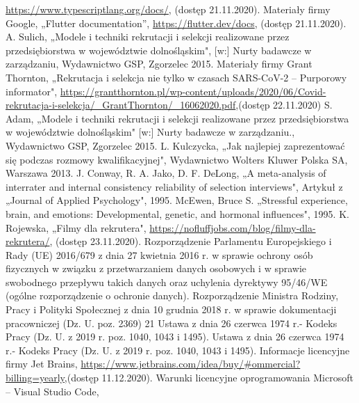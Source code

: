 \documentclass[twoside]{projektInzynierskiMS}
\numberwithin{figure}{section}
\begin{document}
\begin{thebibliography}{12}
\url{https://www.typescriptlang.org/docs/}, (dostęp 21.11.2020).
 Materiały firmy Google, „Flutter documentation”, \newline
\url{https://flutter.dev/docs}, (dostęp 21.11.2020).
 A. Sulich, „Modele i techniki rekrutacji i selekcji realizowane przez przedsiębiorstwa w województwie dolnośląskim", [w:] Nurty badawcze w zarządzaniu, Wydawnictwo GSP, Zgorzelec 2015.
 Materiały firmy Grant Thornton, „Rekrutacja i selekcja nie tylko w czasach SARS-CoV-2 -- Purporowy informator", \newline \url{https://grantthornton.pl/wp-content/uploads/2020/06/Covid-rekrutacja-i-selekcja/\_GrantThornton/\_16062020.pdf},\newline (dostęp 22.11.2020)
 S. Adam, „Modele i techniki rekrutacji i selekcji realizowane przez przedsiębiorstwa w województwie dolnośląskim" [w:] Nurty badawcze w zarządzaniu., Wydawnictwo GSP, Zgorzelec 2015.
 L. Kulczycka, „Jak najlepiej zaprezentować się podczas rozmowy kwalifikacyjnej", Wydawnictwo Wolters Kluwer Polska SA, Warszawa 2013.
 J. Conway, R. A. Jako, D. F. DeLong, „A meta-analysis of interrater and internal consistency reliability of selection interviews", Artykuł z „Journal of Applied Psychology", 1995.
 McEwen, Bruce S. „Stressful experience, brain, and emotions: Developmental, genetic, and hormonal influences", 1995.
 K. Rojewska, „Filmy dla rekrutera", \newline
\url{https://nofluffjobs.com/blog/filmy-dla-rekrutera/}, \newline (dostęp 23.11.2020).
 Rozporządzenie Parlamentu Europejskiego i Rady (UE) 2016/679 z dnia 27 kwietnia 2016 r. w sprawie ochrony osób fizycznych w związku z przetwarzaniem danych osobowych i w sprawie swobodnego przepływu takich danych oraz uchylenia dyrektywy 95/46/WE (ogólne rozporządzenie o ochronie danych).
 Rozporządzenie Ministra Rodziny, Pracy i Polityki Społecznej z dnia 10 grudnia 2018 r. w sprawie dokumentacji pracowniczej (Dz. U. poz. 2369)
21 Ustawa z dnia 26 czerwca 1974 r.- Kodeks Pracy (Dz. U. z 2019 r. poz. 1040, 1043 i 1495).
 Ustawa z dnia 26 czerwca 1974 r.- Kodeks Pracy (Dz. U. z 2019 r. poz. 1040, 1043 i 1495).
 Informacje licencyjne firmy Jet Brains, \newline 
\url{https://www.jetbrains.com/idea/buy/\#ommercial?billing=yearly},\newline (dostęp 11.12.2020).
 Warunki licencyjne oprogramowania Microsoft -- Visual Studio Code, \newline 

\end{thebibliography}
\end{document}
